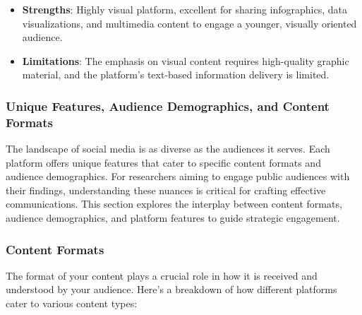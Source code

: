 \documentclass[
]{book}
\providecommand{\tightlist}{%
  \setlength{\itemsep}{0pt}\setlength{\parskip}{0pt}}
\begin{document}
\begin{itemize}
  \begin{itemize}
  \tightlist
  \item
    \textbf{Strengths}: Highly visual platform, excellent for sharing infographics, data visualizations, and multimedia content to engage a younger, visually oriented audience.
  \item
    \textbf{Limitations}: The emphasis on visual content requires high-quality graphic material, and the platform's text-based information delivery is limited.
  \end{itemize}
\end{itemize}

\hypertarget{unique-features-audience-demographics-and-content-formats}{%
\subsubsection{Unique Features, Audience Demographics, and Content Formats}\label{unique-features-audience-demographics-and-content-formats}}

The landscape of social media is as diverse as the audiences it serves. Each platform offers unique features that cater to specific content formats and audience demographics. For researchers aiming to engage public audiences with their findings, understanding these nuances is critical for crafting effective communications. This section explores the interplay between content formats, audience demographics, and platform features to guide strategic engagement.

\hypertarget{content-formats}{%
\subsubsection{Content Formats}\label{content-formats}}

The format of your content plays a crucial role in how it is received and understood by your audience. Here's a breakdown of how different platforms cater to various content types:
\end{document}

